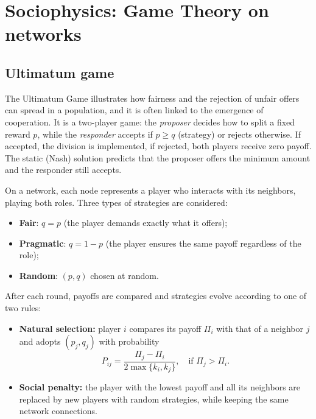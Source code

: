 \chapter{Sociophysics: Game Theory on networks}

 


\section{Ultimatum game}
The Ultimatum Game illustrates \cite{sinatra2009ultimatum} how fairness and the rejection of unfair offers can spread in a population, and it is often linked to the emergence of cooperation.  
It is a two-player game: the \emph{proposer} decides how to split a fixed reward $p$, while the \emph{responder} accepts if $p \geq q$ (strategy) or rejects otherwise. If accepted, the division is implemented, if rejected, both players receive zero payoff.  
The static (Nash) solution predicts that the proposer offers the minimum amount and the responder still accepts.  

\noindent On a network, each node represents a player who interacts with its neighbors, playing both roles. Three types of strategies are considered:  
\begin{itemize}
    \item \textbf{Fair}: $q = p$ (the player demands exactly what it offers);  
    \item \textbf{Pragmatic}: $q = 1-p$ (the player ensures the same payoff regardless of the role);  
    \item \textbf{Random}: $(p,q)$ chosen at random.  
\end{itemize}  

\noindent After each round, payoffs are compared and strategies evolve according to one of two rules:  
\begin{itemize}
    \item \textbf{Natural selection:} player $i$ compares its payoff $\Pi_i$ 
    with that of a neighbor $j$ and adopts $(p_j,q_j)$ with probability
    \begin{equation}
      P_{ij} = \frac{\Pi_j - \Pi_i}{2 \max \{ k_i, k_j \}}, \quad \text{if } \Pi_j > \Pi_i.
    \end{equation}

    \item \textbf{Social penalty:} the player with the lowest payoff and all its neighbors 
    are replaced by new players with random strategies, while keeping the same network connections.  
\end{itemize}



